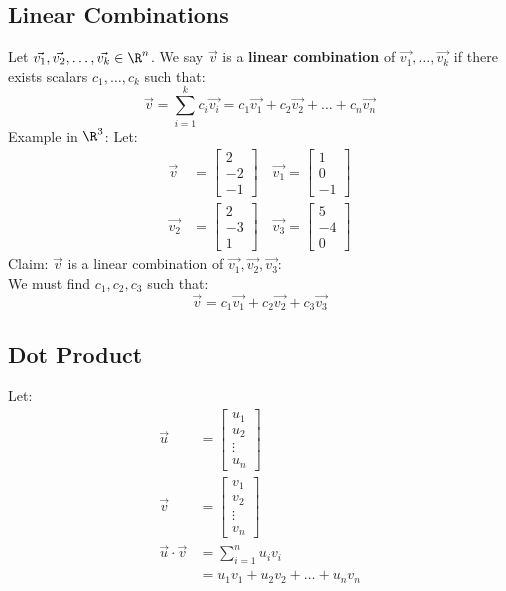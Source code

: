 \documentclass[letterpaper, 12pt]{math}
\begin{document}
\subsection*{Linear Combinations}
Let \( \vec{v_1},\vec{v_2},\dots,\vec{v_k}\in\R^n \). We say
\( \vec{v} \) is a \textbf{linear combination} of
\( \vec{v_1},\dots,\vec{v_k} \) if there exists scalars
\( c_1,\dots,c_k \) such that:
\[ \vec{v} = \sum_{i=1}^kc_i\vec{v_i} =
  c_1\vec{v_1}+c_2\vec{v_2}+\dots+c_n\vec{v_n} \]
Example in \( \R^3 \):
Let:
\begin{align*}
  \vec{v} &=
    \begin{bmatrix}
      2 \\ -2 \\ -1
    \end{bmatrix} \quad
  \vec{v_1} =
    \begin{bmatrix}
      1 \\ 0 \\ -1
    \end{bmatrix} \\
  \vec{v_2} &=
    \begin{bmatrix}
      2 \\ -3 \\ 1
    \end{bmatrix} \quad
  \vec{v_3} =
    \begin{bmatrix}
      5 \\ -4 \\ 0
    \end{bmatrix}
\end{align*}
Claim: \( \vec{v} \) is a linear combination of
\( \vec{v_1},\vec{v_2},\vec{v_3} \): \\
We must find \( c_1,c_2,c_3 \) such that:
\[ \vec{v} = c_1\vec{v_1}+c_2\vec{v_2}+c_3\vec{v_3} \]

\subsection*{Dot Product}
Let:
\begin{align*}
  \vec{u} &=
    \begin{bmatrix}
      u_1 \\ u_2 \\ \vdots \\ u_n
    \end{bmatrix} \\
  \vec{v} &=
    \begin{bmatrix}
      v_1 \\ v_2 \\ \vdots \\ v_n
    \end{bmatrix} \\
  \vec{u}\cdot\vec{v} &= \sum_{i=1}^nu_iv_i \\
  &= u_1v_1+u_2v_2+\dots+u_nv_n
\end{align*}
\end{document}
